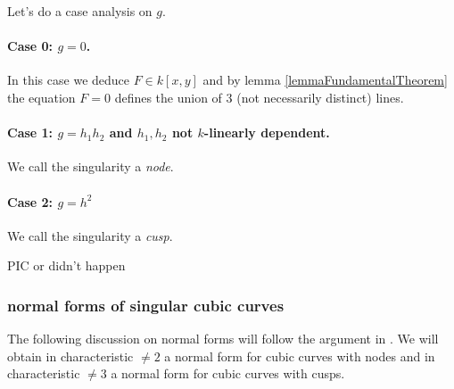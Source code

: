Let's do a case analysis on $g$.
\paragraph{Case 0: $g=0$.}
In this case we deduce $F \in k[x,y]$ and by lemma \ref{lemmaFundamentalTheorem} the equation $F=0$ defines the union of 3 (not necessarily distinct) lines.
\paragraph{Case 1: $g=h_1h_2$ and $h_1,h_2$ not $k$-linearly dependent.}
We call the singularity a \emph{node}.
\paragraph{Case 2: $g=h^2$}
We call the singularity a \emph{cusp}.

\begin{todo}
\item PIC or didn't happen
\end{todo}


\subsubsection{normal forms of singular cubic curves}

The following discussion on normal forms will follow the argument in \cite[Satz 4.9, p.102]{hulek2000elementare}.
We will obtain in characteristic $\neq 2$ a normal form for cubic curves with nodes and in characteristic $\neq 3$ a normal form for cubic curves with cusps.


\begin{todo}
\item 
\end{todo}
